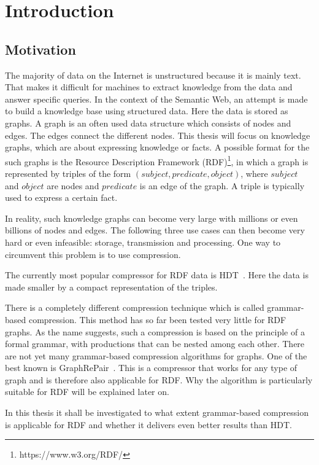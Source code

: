 \chapter{Introduction}\label{ch:introduction}

\section{Motivation}
The majority of data on the Internet is unstructured because it is mainly text. That makes it difficult for machines to extract knowledge from the data and answer specific queries. In the context of the Semantic Web, an attempt is made to build a knowledge base using structured data. Here the data is stored as graphs. A graph is an often used data structure which consists of nodes and edges. The edges connect the different nodes. This thesis will focus on knowledge graphs, which are about expressing knowledge or facts. A possible format for the such graphs is the Resource Description Framework (RDF)\footnote{\label{foot:2}https://www.w3.org/RDF/}, in which a graph is represented by triples of the form $ (subject, predicate, object) $, where $ subject $ and $object$ are nodes and $predicate$ is an edge of the graph. A triple is typically used to express a certain fact.

In reality, such knowledge graphs can become very large with millions or even billions of nodes and edges.  The following three use cases can then become very hard or even infeasible: storage, transmission and processing. One way to circumvent this problem is to use compression.

The currently most popular compressor for RDF data is HDT~\cite{hdt}. Here the data is made smaller by a compact representation of the triples. 

There is a completely different compression technique which is called grammar-based compression. This method has so far been tested very little for RDF graphs. As the name suggests, such a compression is based on the principle of a formal grammar, with productions that can be nested among each other. There are not yet many grammar-based compression algorithms for graphs. One of the best known is GraphRePair~\cite{maneth}. This is a compressor that works for any type of graph and is therefore also applicable for RDF. Why the algorithm is particularly suitable for RDF will be explained later on.

In this thesis it shall be investigated to what extent grammar-based compression is applicable for RDF and whether it delivers even better results than HDT.


